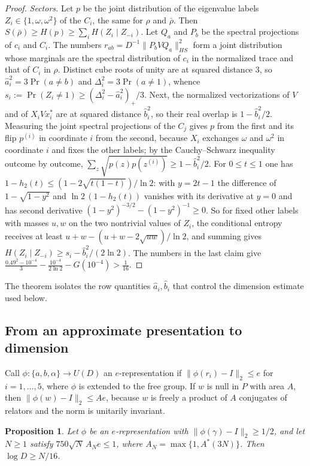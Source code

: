 \documentclass[11pt,a4paper]{article}
\theoremstyle{plain}
\newtheorem{proposition}[theorem]{Proposition}
\theoremstyle{definition}
\theoremstyle{remark}
\begin{document}
\begin{proof}
\emph{Sectors.} Let $p$ be the joint distribution of the eigenvalue labels $Z_i\in\{1,\omega,\omega^2\}$ of the $C_i$, the same for $\rho$ and
$\bar\rho$. Then $S(\bar\rho)\ge H(p)\ge\sum_iH(Z_i\mid Z_{-i})$. Let $Q_a$ and $P_b$ be the spectral projections of $c_i$ and $C_i$. The
numbers $r_{ab}=D^{-1}\|P_bVQ_a\|_{HS}^2$ form a joint distribution whose marginals are the spectral distribution of $c_i$ in the
normalized trace and that of $C_i$ in $\rho$. Distinct cube roots of unity are at squared distance $3$, so $\hat a_i^2=3\Pr(a\ne b)$ and
$\Delta_i^2=3\Pr(a\ne1)$, whence $s_i:=\Pr(Z_i\ne1)\ge(\Delta_i^2-\hat a_i^2)_+/3$. Next, the normalized vectorizations of $V$ and of
$X_iVx_i^*$ are at squared distance $\hat b_i^2$, so their real overlap is $1-\hat b_i^2/2$. Measuring the joint spectral projections of
the $C_j$ gives $p$ from the first and its flip $p^{(i)}$ in coordinate $i$ from the second, because $X_i$ exchanges $\omega$ and $\omega^2$
in coordinate $i$ and fixes the other labels; by the Cauchy--Schwarz inequality outcome by outcome,
$\sum_z\sqrt{p(z)p(z^{(i)})}\ge1-\hat b_i^2/2$. For $0\le t\le1$ one has $1-h_2(t)\le(1-2\sqrt{t(1-t)})/\ln2$: with $y=2t-1$ the difference of
$1-\sqrt{1-y^2}$ and $\ln2\,(1-h_2(t))$ vanishes with its derivative at $y=0$ and has second derivative
$(1-y^2)^{-3/2}-(1-y^2)^{-1}\ge0$. So for fixed other labels with masses $u,w$ on the two nontrivial values of $Z_i$, the conditional
entropy receives at least $u+w-(u+w-2\sqrt{uw})/\ln2$, and summing gives $H(Z_i\mid Z_{-i})\ge s_i-\hat b_i^2/(2\ln2)$. The numbers in the
last claim give $\frac{0.49^2-10^{-4}}3-\frac{10^{-4}}{2\ln2}-G(10^{-4})>\frac1{16}$.
\end{proof}

The theorem isolates the row quantities $\hat a_i,\hat b_i$ that control the dimension estimate used below.

\subsection{From an approximate presentation to dimension}

Call $\phi:\{a,b,\alpha\}\to U(D)$ an $e$-representation if $\|\phi(r_i)-I\|_2\le e$ for $i=1,\dots,5$, where $\phi$
is extended to the free group. If $w$ is null in $P$ with area $A$, then $\|\phi(w)-I\|_2\le Ae$, because $w$ is freely a
product of $A$ conjugates of relators and the norm is unitarily invariant.

\begin{proposition}\label{prop:dimension}
Let $\phi$ be an $e$-representation with $\|\phi(\gamma)-I\|_2\ge1/2$, and let $N\ge1$ satisfy $750\sqrt N\,A_Ne\le1$, where
$A_N=\max\{1,A^*(3N)\}$. Then $\log D\ge N/16$.
\end{proposition}
\end{document}
